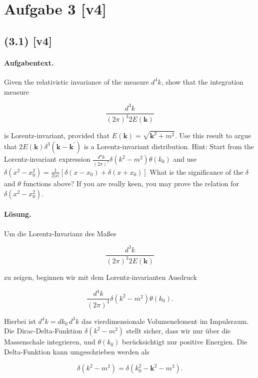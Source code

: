\documentclass[11pt,a4paper]{article}
\begin{document}

\section*{Aufgabe 3 [v4]}
\subsection*{(3.1) [v4]}
\paragraph{Aufgabentext.}
Given the relativistic invariance of the measure $d^4 k$, show that the integration measure

$$
\frac{d^3 k}{(2 \pi)^3 2 E(\mathbf{k})}
$$

is Lorentz-invariant, provided that $E(\mathbf{k})=\sqrt{\mathbf{k}^2+m^2}$. Use this result to argue that $2 E(\mathbf{k}) \delta^3\left(\mathbf{k}-\mathbf{k}^{\prime}\right)$ is a Lorentz-invariant distribution.
Hint: Start from the Lorentz-invariant expression $\frac{d^4 k}{(2 \pi)^3} \delta\left(k^2-m^2\right) \theta\left(k_0\right)$ and use $\delta\left(x^2-x_0^2\right)=\frac{1}{2|x|}\left[\delta\left(x-x_0\right)+\delta\left(x+x_0\right)\right]$ What is the significance of the $\delta$ and $\theta$ functions above? If you are really keen, you may prove the relation for $\delta\left(x^2-x_0^2\right)$.

\paragraph{Lösung.}
Um die Lorentz-Invarianz des Maßes 

\[
\frac{d^3 k}{(2 \pi)^3 2 E(\mathbf{k})}
\]

zu zeigen, beginnen wir mit dem Lorentz-invarianten Ausdruck 

\[
\frac{d^4 k}{(2 \pi)^3} \delta\left(k^2 - m^2\right) \theta\left(k_0\right).
\]

Hierbei ist $d^4 k = dk_0 \, d^3 k$ das vierdimensionale Volumenelement im Impulsraum. Die Dirac-Delta-Funktion $\delta\left(k^2 - m^2\right)$ stellt sicher, dass wir nur über die Massenschale integrieren, und $\theta\left(k_0\right)$ berücksichtigt nur positive Energien. Die Delta-Funktion kann umgeschrieben werden als 

\[
\delta\left(k^2 - m^2\right) = \delta\left(k_0^2 - \mathbf{k}^2 - m^2\right).
\]
\end{document}

